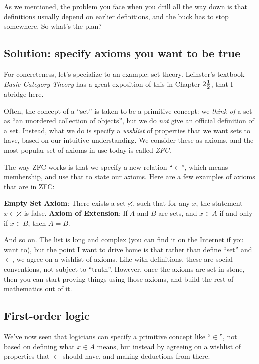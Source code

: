 \documentclass[11pt]{scrartcl}
\begin{document}
As we mentioned, the problem you face when you drill all the way down
is that definitions usually depend on earlier definitions,
and the buck has to stop somewhere. So what's the plan?

\subsection{Solution: specify axioms you want to be true}
For concreteness, let's specialize to an example: set theory.
Leinster's textbook \emph{Basic Category Theory} has a
great exposition of this in Chapter $2\frac{1}{2}$, that I abridge here.

Often, the concept of a ``set'' is taken to be a primitive concept:
we \emph{think of} a set as ``an unordered collection of objects'',
but we do \emph{not} give an official definition of a set.
Instead, what we do is specify a \emph{wishlist} of properties that
we want sets to have, based on our intuitive understanding.
We consider these as axioms,
and the most popular set of axioms in use today is called \emph{ZFC}.

The way ZFC works is that we specify a new relation ``$\in$'',
which means membership, and use that to state our axioms.
Here are a few examples of axioms that are in ZFC:
\begin{itemize}
  \ii \textbf{Empty Set Axiom}:
  There exists a set $\varnothing$, such that for any $x$,
  the statement $x \in \varnothing$ is false.
  \ii \textbf{Axiom of Extension}:
  If $A$ and $B$ are sets, and $x \in A$ if and only if $x \in B$,
  then $A = B$.
\end{itemize}
And so on.
The list is long and complex (you can find it on the Internet if you want to),
but the point I want to drive home is that
\alert{rather than define ``set'' and $\in$, we agree on a wishlist of axioms}.
Like with definitions, these are social conventions, not subject to ``truth''.
However, once the axioms are set in stone,
then you can start proving things using those axioms,
and build the rest of mathematics out of it.

\subsection{First-order logic}
We've now seen that logicians can specify a primitive concept like ``$\in$'',
not based on defining what $x \in A$ means,
but instead by agreeing on a wishlist of properties that $\in$ should have,
and making deductions from there.
\end{document}
